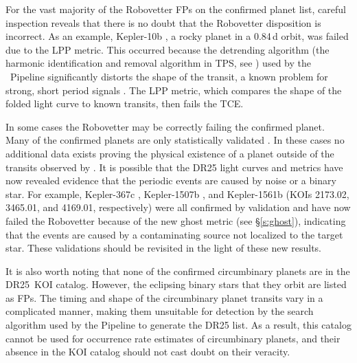 For the vast majority of the Robovetter FPs on the confirmed planet list, careful inspection reveals that there is no doubt that the Robovetter disposition is incorrect. As an example, Kepler-10b \citep[][]{Batalha2011Kepler10,Fogtmann2014Kepler10}, a rocky planet in a 0.84\,d orbit, was failed due to the LPP metric. This occurred because the detrending algorithm (the harmonic identification and removal algorithm in TPS, see \citealt{JenkinsKDPH}) used by the \Kepler\ Pipeline significantly distorts the shape of the transit, a known problem for strong, short period signals \citep{Christiansen2015}.  The LPP metric, which compares the shape of the folded light curve to known transits, then fails the TCE.

In some cases the Robovetter may be correctly failing the confirmed planet.  Many of the confirmed planets are only statistically validated \citep{Morton2016,Rowe2014}. In these cases no additional data exists proving the physical existence of a planet outside of the transits observed by \Kepler. It is possible that the DR25 light curves and metrics have now revealed evidence that the periodic events are caused by noise or a binary star. For example, Kepler-367c \citep{Rowe2014}, Kepler-1507b \citep{Morton2016}, and Kepler-1561b \citep{Morton2016} (KOIs 2173.02, 3465.01, and 4169.01, respectively) were all confirmed by validation and have now failed the Robovetter because of the new ghost metric (see \S\ref{s:ghost}), indicating that the events are caused by a contaminating source not localized to the target star.  These validations should be revisited in the light of these new results.

It is also worth noting that none of the confirmed circumbinary planets \citep[e.g.,][]{Doyle2011,Orosz2012} are in the DR25~KOI catalog. However, the eclipsing binary stars that they orbit are listed as FPs.  The timing and shape of the circumbinary planet transits vary in a complicated manner, making them unsuitable for detection by the search algorithm used by the \Kepler{} Pipeline to generate the DR25 \opstce{} list.  As a result, this catalog cannot be used for occurrence rate estimates of circumbinary planets, and their absence in the KOI catalog should not cast doubt on their veracity. 


